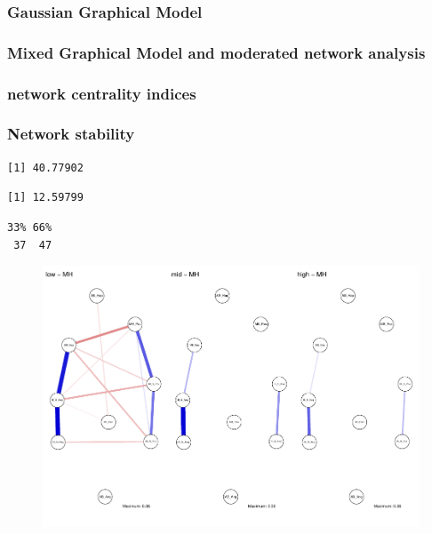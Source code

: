 \documentclass[man,floatsintext]{apa6}
\begin{document}
\subsubsection{Gaussian Graphical Model}\label{gaussian-graphical-model}

\subsubsection{Mixed Graphical Model and moderated network
analysis}\label{mixed-graphical-model-and-moderated-network-analysis}

\subsubsection{network centrality
indices}\label{network-centrality-indices}

\subsubsection{Network stability}\label{network-stability}

\begin{verbatim}
[1] 40.77902
\end{verbatim}

\begin{verbatim}
[1] 12.59799
\end{verbatim}

\begin{verbatim}
33% 66% 
 37  47 
\end{verbatim}

\begin{figure}
\centering
\includegraphics{script_files/figure-latex/glasso networks-1.pdf}
\caption{}
\end{figure}
\end{document}
